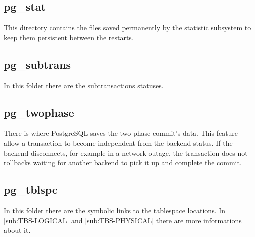 \subsection{pg\_stat}
This directory contains the files saved permanently by the statistic subsystem to keep them
persistent between the restarts. 

\subsection{pg\_subtrans}
In this folder there are the subtransactions statuses. 

\subsection{pg\_twophase}
There is where PostgreSQL saves the two phase commit's data. This feature allow a transaction to
become independent from the backend status. If the backend disconnects, for example in a network
outage, the transaction does not rollbacks waiting for another backend to pick it up and complete
the commit. 

\subsection{pg\_tblspc}
\label{sub:TABLESPACE}
In this folder there are the symbolic links to the tablespace locations.
In \ref{sub:TBS-LOGICAL} and \ref{sub:TBS-PHYSICAL} there are more informations about it. 



